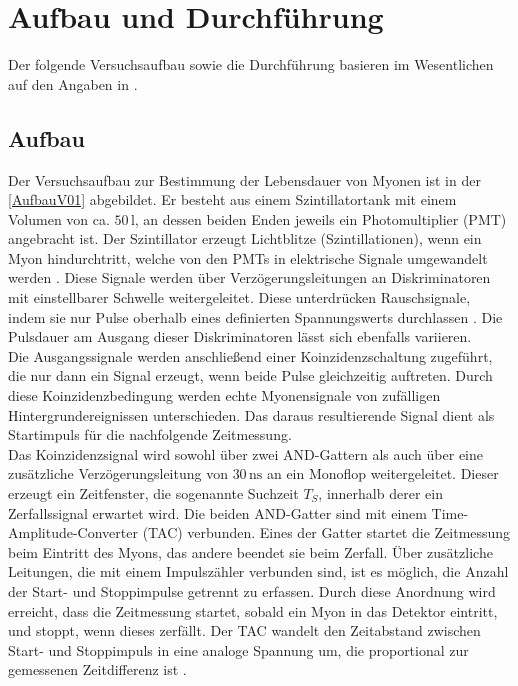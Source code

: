 \section{Aufbau und Durchführung}
Der folgende Versuchsaufbau sowie die Durchführung basieren im Wesentlichen auf den Angaben in \cite{anleitungV01}.
\subsection{Aufbau}
\label{Aufbau}
Der Versuchsaufbau zur Bestimmung der Lebensdauer von Myonen ist in der \autoref{AufbauV01} abgebildet.
Er besteht aus einem Szintillatortank mit einem Volumen von ca. $50\,\unit{\litre}$, an dessen beiden Enden jeweils ein Photomultiplier (PMT) angebracht ist.
Der Szintillator erzeugt Lichtblitze (Szintillationen), wenn ein Myon hindurchtritt, welche von den PMTs in elektrische Signale umgewandelt werden \cite{Teilchendetektoren}.
Diese Signale werden über Verzögerungsleitungen an Diskriminatoren mit einstellbarer Schwelle weitergeleitet. Diese unterdrücken Rauschsignale, indem sie nur Pulse oberhalb eines definierten Spannungswerts durchlassen \cite{Techniques}.
Die Pulsdauer am Ausgang dieser Diskriminatoren lässt sich ebenfalls variieren.\\
Die Ausgangssignale werden anschließend einer Koinzidenzschaltung zugeführt, 
die nur dann ein Signal erzeugt, wenn beide Pulse gleichzeitig auftreten. 
Durch diese Koinzidenzbedingung werden echte Myonensignale von zufälligen Hintergrundereignissen unterschieden.
Das daraus resultierende Signal dient als Startimpuls für die nachfolgende Zeitmessung.\\
Das Koinzidenzsignal wird sowohl über zwei AND-Gattern als auch über eine zusätzliche Verzögerungsleitung von $30\,\unit{\nano\second}$ an ein Monoflop
weitergeleitet. Dieser erzeugt ein Zeitfenster, die sogenannte Suchzeit $T_S$, innerhalb derer ein Zerfallssignal erwartet wird. 
Die beiden AND-Gatter sind mit einem Time-Amplitude-Converter (TAC) verbunden. Eines der Gatter startet die Zeitmessung beim Eintritt
des Myons, das andere beendet sie beim Zerfall.
Über zusätzliche Leitungen, die mit einem Impulszähler verbunden sind, ist es möglich, die Anzahl der
Start- und Stoppimpulse getrennt zu erfassen. Durch diese Anordnung wird erreicht, dass die Zeitmessung startet, sobald ein Myon in das Detektor eintritt, und stoppt, wenn dieses zerfällt. 
Der TAC wandelt den Zeitabstand zwischen Start- und Stoppimpuls in eine analoge Spannung um, die proportional zur gemessenen Zeitdifferenz ist \cite{Techniques}.\\
